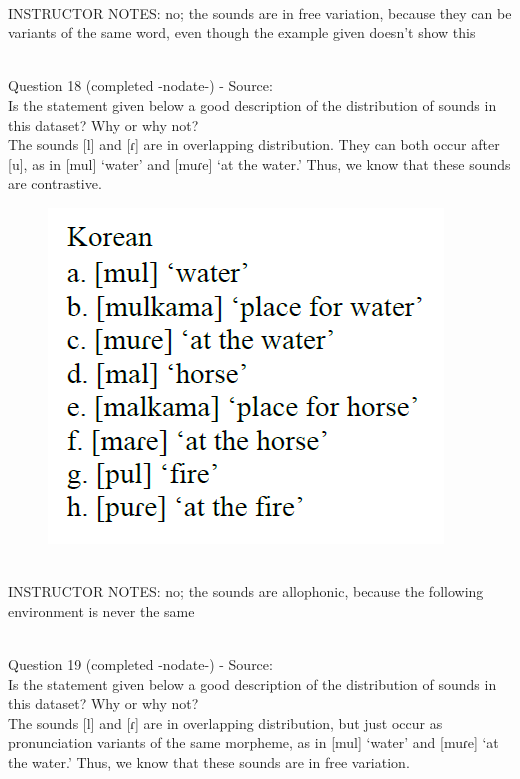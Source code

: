 \documentclass[12pt]{article}
\begin{document}
~\\
INSTRUCTOR NOTES: no; the sounds are in free variation, because they can be variants of the same word, even though the example given doesn't show this


~\\

{\large Question 18} (completed -nodate-) - Source: \\

Is the statement given below a good description of the distribution of sounds in this dataset? Why or why not?\\

The sounds {[l]} and {[ɾ]} are in overlapping distribution. They can both occur after {[u]}, as in {[mul]} ‘water’ and {[muɾe]} ‘at the water.’ Thus, we know that these sounds are contrastive.

\begin{figure}[H]
\includegraphics{../images/korean.png}
\end{figure}

~\\
INSTRUCTOR NOTES: no; the sounds are allophonic, because the following environment is never the same


~\\

{\large Question 19} (completed -nodate-) - Source: \\

Is the statement given below a good description of the distribution of sounds in this dataset? Why or why not?\\

The sounds {[l]} and {[ɾ]} are in overlapping distribution, but just occur as pronunciation variants of the same morpheme, as in {[mul]} ‘water’ and {[muɾe]} ‘at the water.’ Thus, we know that these sounds are in free variation.
\end{document}
